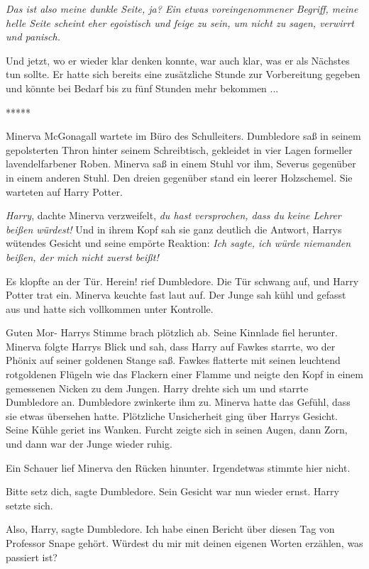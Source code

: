 \emph{Das ist also meine dunkle Seite, ja? Ein etwas voreingenommener Begriff,
meine helle Seite scheint eher egoistisch und feige zu sein, um nicht zu sagen,
verwirrt und panisch.}

Und jetzt, wo er wieder klar denken konnte, war auch klar, was er als Nächstes
tun sollte. Er hatte sich bereits eine zusätzliche Stunde zur Vorbereitung
gegeben und könnte bei Bedarf bis zu fünf Stunden mehr bekommen ...

\begin{center}*****\end{center}

Minerva McGonagall wartete im Büro des Schulleiters. Dumbledore saß in seinem
gepolsterten Thron hinter seinem Schreibtisch, gekleidet in vier Lagen formeller
lavendelfarbener Roben. Minerva saß in einem Stuhl vor ihm, Severus gegenüber in
einem anderen Stuhl. Den dreien gegenüber stand ein leerer Holzschemel. Sie
warteten auf Harry Potter.

\emph{Harry}, dachte Minerva verzweifelt, \emph{du hast versprochen, dass du
keine Lehrer beißen würdest!} Und in ihrem Kopf sah sie ganz deutlich die
Antwort, Harrys wütendes Gesicht und seine empörte Reaktion: \emph{Ich sagte,
ich würde niemanden beißen, der mich nicht zuerst beißt!}

Es klopfte an der Tür. \glqq{}Herein!\grqq{} rief Dumbledore. Die Tür schwang
auf, und Harry Potter trat ein. Minerva keuchte fast laut auf. Der Junge sah
kühl und gefasst aus und hatte sich vollkommen unter Kontrolle.

\glqq{}Guten Mor-\grqq{} Harrys Stimme brach plötzlich ab. Seine Kinnlade fiel
herunter. Minerva folgte Harrys Blick und sah, dass Harry auf Fawkes starrte, wo
der Phönix auf seiner goldenen Stange saß. Fawkes flatterte mit seinen leuchtend
rotgoldenen Flügeln wie das Flackern einer Flamme und neigte den Kopf in einem
gemessenen Nicken zu dem Jungen. Harry drehte sich um und starrte Dumbledore an.
Dumbledore zwinkerte ihm zu. Minerva hatte das Gefühl, dass sie etwas übersehen
hatte. Plötzliche Unsicherheit ging über Harrys Gesicht. Seine Kühle geriet ins
Wanken. Furcht zeigte sich in seinen Augen, dann Zorn, und dann war der Junge
wieder ruhig.

Ein Schauer lief Minerva den Rücken hinunter. Irgendetwas stimmte hier nicht.

\glqq{}Bitte setz dich\grqq{}, sagte Dumbledore. Sein Gesicht war nun wieder
ernst. Harry setzte sich.

\glqq{}Also, Harry\grqq{}, sagte Dumbledore. \glqq{}Ich habe einen Bericht über
diesen Tag von Professor Snape gehört. Würdest du mir mit deinen eigenen Worten
erzählen, was passiert ist?\grqq{}

